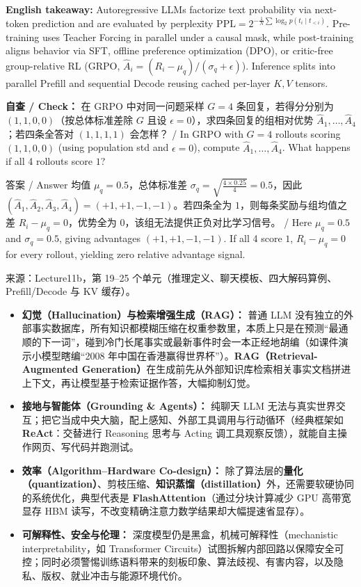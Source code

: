 \textbf{English takeaway:} Autoregressive LLMs factorize text probability via next-token prediction and are evaluated by perplexity $\mathrm{PPL}=2^{-\frac{1}{N}\sum \log_2 p(t_i\mid t_{<i})}$. Pre-training uses Teacher Forcing in parallel under a causal mask, while post-training aligns behavior via SFT, offline preference optimization (DPO), or critic-free group-relative RL (GRPO, $\hat{A}_i=(R_i-\mu_q)/(\sigma_q+\epsilon)$). Inference splits into parallel Prefill and sequential Decode reusing cached per-layer $K,V$ tensors.

\textbf{自查 / Check：} 在 GRPO 中对同一问题采样 $G=4$ 条回复，若得分分别为 $(1, 1, 0, 0)$（按总体标准差除 $G$ 且设 $\epsilon=0$），求四条回复的组相对优势 $\hat{A}_1,\dots,\hat{A}_4$；若四条全答对 $(1,1,1,1)$ 会怎样？ / In GRPO with $G=4$ rollouts scoring $(1,1,0,0)$ (using population std and $\epsilon=0$), compute $\hat{A}_1,\dots,\hat{A}_4$. What happens if all 4 rollouts score $1$?

\begin{StudySolution}{答案 / Answer}
均值 $\mu_q = 0.5$，总体标准差 $\sigma_q = \sqrt{\frac{4\times 0.25}{4}} = 0.5$，因此 $(\hat{A}_1,\hat{A}_2,\hat{A}_3,\hat{A}_4) = (+1, +1, -1, -1)$。若四条全为 $1$，则每条奖励与组均值之差 $R_i-\mu_q=0$，优势全为 $0$，该组无法提供正负对比学习信号。 / Here $\mu_q=0.5$ and $\sigma_q=0.5$, giving advantages $(+1,+1,-1,-1)$. If all 4 score $1$, $R_i-\mu_q=0$ for every rollout, yielding zero relative advantage signal.
\end{StudySolution}

来源：Lecture11b，第 19–25 个单元（推理定义、聊天模板、四大解码算例、Prefill/Decode 与 KV 缓存）。



\begin{itemize}
\item \textbf{幻觉（Hallucination）与检索增强生成（RAG）：} 普通 LLM 没有独立的外部事实数据库，所有知识都模糊压缩在权重参数里，本质上只是在预测“最通顺的下一词”，碰到冷门长尾事实或最新事件时会一本正经地胡编（如课件演示小模型瞎编“2008 年中国在香港赢得世界杯”）。\textbf{RAG（Retrieval-Augmented Generation）}在生成前先从外部知识库检索相关事实文档拼进上下文，再让模型基于检索证据作答，大幅抑制幻觉。
\item \textbf{接地与智能体（Grounding \& Agents）：} 纯聊天 LLM 无法与真实世界交互；把它当成中央大脑，配上感知、外部工具调用与行动循环（经典框架如 \textbf{ReAct}：交替进行 Reasoning 思考与 Acting 调工具观察反馈），就能自主操作网页、写代码并跑测试。
\item \textbf{效率（Algorithm–Hardware Co-design）：} 除了算法层的\textbf{量化（quantization）}、剪枝压缩、\textbf{知识蒸馏（distillation）}外，还需要软硬协同的系统优化，典型代表是 \textbf{FlashAttention}（通过分块计算减少 GPU 高带宽显存 HBM 读写，不改变精确注意力数学结果却大幅提速省显存）。
\item \textbf{可解释性、安全与伦理：} 深度模型仍是黑盒，机械可解释性（mechanistic interpretability，如 Transformer Circuits）试图拆解内部回路以保障安全可控；同时必须警惕训练语料带来的刻板印象、算法歧视、有害内容，以及隐私、版权、就业冲击与能源环境代价。
\end{itemize}

